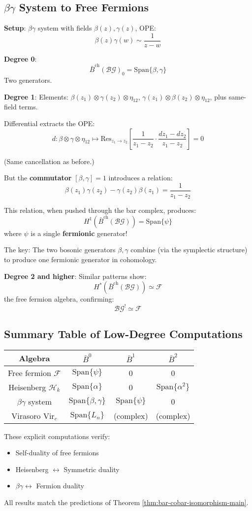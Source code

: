 \subsection{$\beta\gamma$ System to Free Fermions}

\textbf{Setup}: $\beta\gamma$ system with fields $\beta(z), \gamma(z)$, OPE:
$$\beta(z)\gamma(w) \sim \frac{1}{z-w}$$

\textbf{Degree 0}:
$$\bar{B}^{\text{ch}}(\mathcal{BG})_0 = \text{Span}\{\beta, \gamma\}$$
Two generators.

\textbf{Degree 1}:
Elements: $\beta(z_1) \otimes \gamma(z_2) \otimes \eta_{12}$, 
$\gamma(z_1) \otimes \beta(z_2) \otimes \eta_{12}$, plus same-field terms.

Differential extracts the OPE:
$$d: \beta \otimes \gamma \otimes \eta_{12} \mapsto 
   \text{Res}_{z_1 \to z_2}\left[\frac{1}{z_1-z_2} \cdot \frac{dz_1-dz_2}{z_1-z_2}\right] = 0$$

(Same cancellation as before.)

But the \textbf{commutator} $[\beta, \gamma] = 1$ introduces a relation:
$$\beta(z_1)\gamma(z_2) - \gamma(z_2)\beta(z_1) = \frac{1}{z_1-z_2}$$

This relation, when pushed through the bar complex, produces:
$$H^1(\bar{B}^{\text{ch}}(\mathcal{BG})) = \text{Span}\{\psi\}$$
where $\psi$ is a single \textbf{fermionic} generator!

The key: The two bosonic generators $\beta, \gamma$ combine (via the symplectic structure) 
to produce one fermionic generator in cohomology.

\textbf{Degree 2 and higher}: Similar patterns show:
$$H^*(\bar{B}^{\text{ch}}(\mathcal{BG})) \simeq \mathcal{F}$$
the free fermion algebra, confirming:
$$\mathcal{BG}^! \simeq \mathcal{F}$$

\subsection{Summary Table of Low-Degree Computations}

\begin{center}
\begin{tabular}{c|c|c|c}
\textbf{Algebra} & $\bar{B}^0$ & $\bar{B}^1$ & $\bar{B}^2$ \\ \hline
Free fermion $\mathcal{F}$ & $\text{Span}\{\psi\}$ & 0 & 0 \\
Heisenberg $\mathcal{H}_k$ & $\text{Span}\{\alpha\}$ & 0 & $\text{Span}\{\alpha^2\}$ \\
$\beta\gamma$ system & $\text{Span}\{\beta,\gamma\}$ & $\text{Span}\{\psi\}$ & 0 \\
Virasoro $\text{Vir}_c$ & $\text{Span}\{L_n\}$ & (complex) & (complex)
\end{tabular}
\end{center}

These explicit computations verify:
\begin{itemize}
\item Self-duality of free fermions
\item Heisenberg $\leftrightarrow$ Symmetric duality
\item $\beta\gamma \leftrightarrow$ Fermion duality
\end{itemize}

All results match the predictions of Theorem \ref{thm:bar-cobar-isomorphism-main}.




